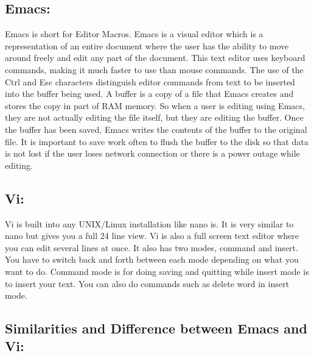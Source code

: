 \documentclass{article} %
\begin{document}
\noindent 

\noindent 

\noindent 
\subsection{Emacs:}

\noindent 

\noindent Emacs is short for Editor Macros. Emacs is a visual editor which is a representation of an entire document where the user has the ability to move around freely and edit any part of the document. This text editor uses keyboard commands, making it much faster to use than mouse commands. The use of the Ctrl and Esc characters distinguish editor commands from text to be inserted into the buffer being used. A buffer is a copy of a file that Emacs creates and stores the copy in part of RAM memory. So when a user is editing using Emacs, they are not actually editing the file itself, but they are editing the buffer. Once the buffer has been saved, Emacs writes the contents of the buffer to the original file. It is important to save work often to flush the buffer to the disk so that data is not lost if the user loses network connection or there is a power outage while editing.

\noindent 

\noindent 

\noindent 
\subsection{Vi:}

\noindent 

\noindent Vi is built into any UNIX/Linux installation like nano is. It is very similar to nano but gives you a full 24 line view. Vi is also a full screen text editor where you can edit several lines at once. It also has two modes, command and insert. You have to switch back and forth between each mode depending on what you want to do. Command mode is for doing saving and quitting while insert mode is to insert your text. You can also do commands such as delete word in insert mode. 

\noindent 

\noindent 

\noindent 
\subsection{Similarities and Difference between Emacs and Vi:}
\end{document}
